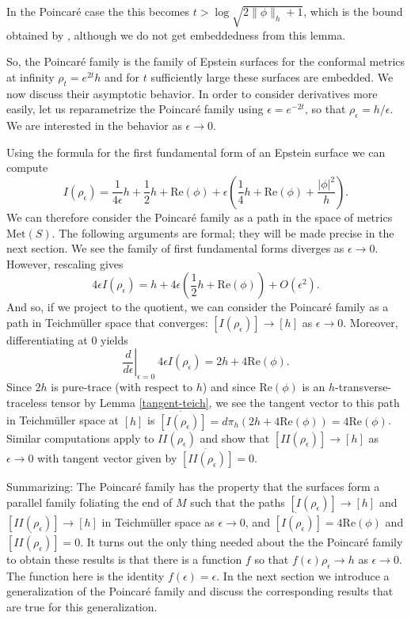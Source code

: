 \documentclass{amsart}
\newcommand{\two}{I\!\!I}
\begin{document}
In the Poincar\'e case the this becomes $t > \log \sqrt{2\|\phi\|_h + 1}$, which is the bound obtained by \cite{anderson1998}, although we do not get embeddedness from this lemma. 

So, the Poincar\'e family is the family of Epstein surfaces for the conformal metrics at infinity $\rho_t = e^{2t}h$ and for $t$ sufficiently large these surfaces are embedded. 
We now discuss their asymptotic behavior. 
In order to consider derivatives more easily, let us reparametrize the Poincar\'e family using $\epsilon = e^{-2t}$, so that $\rho_\epsilon = h/\epsilon$. 
We are interested in the behavior as $\epsilon \to 0$. 

Using the formula for the first fundamental form of an Epstein surface we can compute
\[
I(\rho_\epsilon) = \frac{1}{4\epsilon} h + \frac{1}{2} h + \mathrm{Re}(\phi) + \epsilon \left( \frac{1}{4} h + \mathrm{Re}(\phi) + \frac{|\phi|^2}{h} \right).
\]
We can therefore consider the Poincar\'e family as a path in the space of metrics $\mathrm{Met}(S)$. 
The following arguments are formal; they will be made precise in the next section. 
We see the family of first fundamental forms diverges as $\epsilon \to 0$. 
However, rescaling gives
\[
4\epsilon I(\rho_\epsilon) = h + 4\epsilon \left( \frac{1}{2}h + \mathrm{Re}(\phi) \right) + O(\epsilon^2).
\]
And so, if we project to the quotient, we can consider the Poincar\'e family as a path in Teichm\"uller space that converges: $[I(\rho_\epsilon)] \to [h]$ as $\epsilon \to 0$. 
Moreover, differentiating at $0$ yields
\[
\left. \frac{d}{d\epsilon} \right|_{\epsilon = 0} \ 4\epsilon I(\rho_\epsilon) = 2h + 4 \mathrm{Re}(\phi).
\]
Since $2 h $ is pure-trace (with respect to $h$) and since $\mathrm{Re}(\phi)$ is an $h$-transverse-traceless tensor by Lemma \ref{tangent-teich}, we see the tangent vector to this path in Teichm\"uller space at $[h]$ is $\dot{[I(\rho_\epsilon)]} = d \pi_h (2h + 4 \mathrm{Re}(\phi)) = 4 \mathrm{Re}(\phi)$. Similar computations apply to $\two(\rho_\epsilon)$ and show that $[\two(\rho_\epsilon)] \to [h]$ as $\epsilon \to 0$ with tangent vector given by $\dot{[\two(\rho_\epsilon)]} = 0$. 

Summarizing: The Poincar\'e family has the property that the surfaces form a parallel family foliating the end of $M$ such that the paths $[I(\rho_\epsilon)] \to [h]$ and $[\two(\rho_\epsilon)] \to [h]$ in Teichm\"uller space as $\epsilon \to 0$, and $\dot{[I(\rho_\epsilon)]} = 4 \mathrm{Re}(\phi)$ and $\dot{[\two(\rho_\epsilon)]} = 0$. 
It turns out the only thing needed about the the Poincar\'e family to obtain these results is that there is a function $f$ so that $f(\epsilon)\rho_\epsilon \to h$ as $\epsilon \to 0$. 
The function here is the identity $f(\epsilon) = \epsilon$. 
In the next section we introduce a generalization of the Poincar\'e family and discuss the corresponding results that are true for this generalization.
\end{document}
